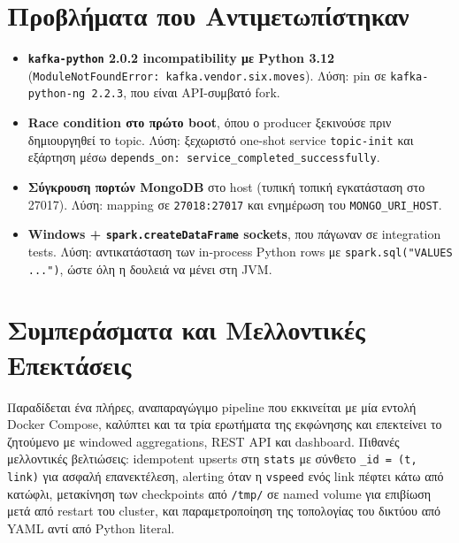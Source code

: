 \documentclass[11pt,a4paper]{article}
\newcommand{\code}[1]{\texttt{\small #1}}
\begin{document}
\newpage
\section{Προβλήματα που Αντιμετωπίστηκαν}
\begin{itemize}
  \item \textbf{\code{kafka-python} 2.0.2 incompatibility με Python 3.12} (\code{ModuleNotFoundError: kafka.vendor.six.moves}). Λύση: pin σε \code{kafka-python-ng 2.2.3}, που είναι API-συμβατό fork.
  \item \textbf{Race condition στο πρώτο boot}, όπου ο producer ξεκινούσε πριν δημιουργηθεί το topic. Λύση: ξεχωριστό one-shot service \code{topic-init} και εξάρτηση μέσω \code{depends\_on: service\_completed\_successfully}.
  \item \textbf{Σύγκρουση πορτών MongoDB} στο host (τυπική τοπική εγκατάσταση στο 27017). Λύση: mapping σε \code{27018:27017} και ενημέρωση του \code{MONGO\_URI\_HOST}.
  \item \textbf{Windows + \code{spark.createDataFrame} sockets}, που πάγωναν σε integration tests. Λύση: αντικατάσταση των in-process Python rows με \code{spark.sql("VALUES ...")}, ώστε όλη η δουλειά να μένει στη JVM.
\end{itemize}

\section{Συμπεράσματα και Μελλοντικές Επεκτάσεις}
Παραδίδεται ένα πλήρες, αναπαραγώγιμο pipeline που εκκινείται με μία εντολή Docker Compose, καλύπτει και τα τρία ερωτήματα της εκφώνησης και επεκτείνει το ζητούμενο με windowed aggregations, REST API και dashboard. Πιθανές μελλοντικές βελτιώσεις: idempotent upserts στη \code{stats} με σύνθετο \code{\_id = (t, link)} για ασφαλή επανεκτέλεση, alerting όταν η \code{vspeed} ενός link πέφτει κάτω από κατώφλι, μετακίνηση των checkpoints από \code{/tmp/} σε named volume για επιβίωση μετά από restart του cluster, και παραμετροποίηση της τοπολογίας του δικτύου από YAML αντί από Python literal.

% 
\end{document}
